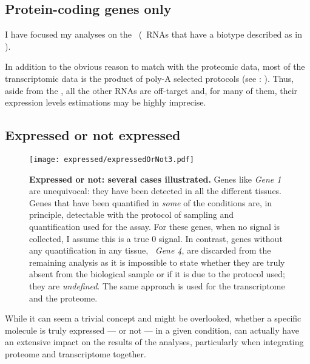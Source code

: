 \subsection{Protein-coding genes only}\label{subsec:protcodingOnly}
\vspace{-0.15in}
I have focused my analyses on the \mRNAs\ (\ie\ \glspl{RNA} that have a
biotype described as \emph{\pc} in ).\mybr\

In addition to the obvious reason to match with the proteomic data,
most of the transcriptomic data is the product of poly-A selected protocols
(see : ).
Thus, aside from the \mRNAs, all the other \glspl{RNA} are off-target
and, for many of them,
their expression levels estimations may be highly imprecise.\mybr\

\vspace{-0.1in}
\subsection{Expressed or not expressed}\label{sec:ExpressedOrNot}
\vspace{-0.3in}
\begin{figure}[!htb]
    \texttt{[image: expressed/expressedOrNot3.pdf]}\centering
      \caption[Expressed or not: several cases illustrated]
      {\label{fig:DefineExpression}\textbf{Expressed or not: several cases
      illustrated.}\smallbreak{} Genes like \emph{Gene 1} are unequivocal: they have been
      detected in all the different tissues. Genes that have been quantified in
      \emph{some} of the conditions are, in principle, detectable with the
      protocol of sampling and quantification used for the assay.
      For these genes, when no signal is collected, I assume this is a true $0$ signal.
      In contrast, genes without any quantification
      in any tissue, \eg\ \emph{Gene 4}, are discarded from the remaining analysis as
      it is impossible to state
      whether they are truly absent from the biological sample or if it is due
      to the protocol used; they are \emph{undefined}. The same approach is used
      for the transcriptome and the proteome.}
\end{figure}

While it can seem a trivial concept and might be overlooked, whether a specific
molecule is truly expressed --- or not --- in a given condition, can actually have
an extensive impact on the results of the analyses, particularly when integrating
proteome and transcriptome together.\mybr\

